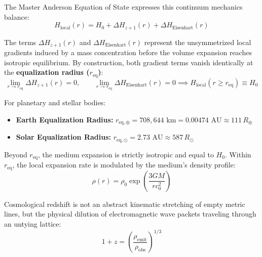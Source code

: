 \documentclass[11pt,a4paper]{article}
\begin{document}
The Master Anderson Equation of State expresses this continuum mechanics balance:
\begin{equation}
H_{\text{local}}(r) = H_0 + \Delta H_{z+1}(r) + \Delta H_{\text{Eisenhart}}(r)
\label{eq:master_anderson_local}
\end{equation}

The terms $\Delta H_{z+1}(r)$ and $\Delta H_{\text{Eisenhart}}(r)$ represent the unsymmetrized local gradients induced by a mass concentration before the volume expansion reaches isotropic equilibrium. By construction, both gradient terms vanish identically at the \textbf{equalization radius ($r_{\text{eq}}$)}:
\begin{equation}
\lim_{r \to r_{\text{eq}}} \Delta H_{z+1}(r) = 0, \qquad \lim_{r \to r_{\text{eq}}} \Delta H_{\text{Eisenhart}}(r) = 0 \implies H_{\text{local}}(r \ge r_{\text{eq}}) \equiv H_0
\label{eq:req_limit}
\end{equation}

For planetary and stellar bodies:
\begin{itemize}
    \item \textbf{Earth Equalization Radius:} $r_{\text{eq},\oplus} = 708,644\text{ km} = 0.00474\text{ AU} \approx 111\,R_\oplus$
    \item \textbf{Solar Equalization Radius:} $r_{\text{eq},\odot} = 2.73\text{ AU} \approx 587\,R_\odot$
\end{itemize}

Beyond $r_{\text{eq}}$, the medium expansion is strictly isotropic and equal to $H_0$. Within $r_{\text{eq}}$, the local expansion rate is modulated by the medium's density profile:
\begin{equation}
\rho(r) = \rho_0 \exp\left(\frac{3GM}{r c_0^2}\right)
\label{eq:rho_profile}
\end{equation}

Cosmological redshift is not an abstract kinematic stretching of empty metric lines, but the physical dilution of electromagnetic wave packets traveling through an untying lattice:
\begin{equation}
1 + z = \left(\frac{\rho_{\text{emit}}}{\rho_{\text{obs}}}\right)^{1/3}
\label{eq:lattice_dilution_z}
\end{equation}
\end{document}
